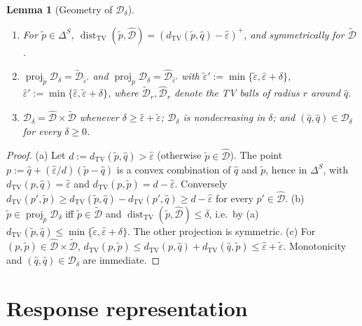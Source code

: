 \documentclass[11pt]{article}
\newtheorem{lemma}{Lemma}
\theoremstyle{definition}
\theoremstyle{remark}
\newcommand{\D}{\mathcal{D}}
\newcommand{\Dh}{\hat{\mathcal{D}}}
\newcommand{\Dt}{\tilde{\mathcal{D}}}
\newcommand{\tp}{\tilde{p}}
\newcommand{\heps}{\hat{\varepsilon}}
\newcommand{\teps}{\tilde{\varepsilon}}
\newcommand{\dtv}{d_{\mathrm{TV}}}
\DeclareMathOperator{\proj}{proj}
\DeclareMathOperator{\dist}{dist}
\begin{document}
\begin{lemma}[Geometry of $\D_\delta$]\label{lem:geom}
\begin{enumerate}[label=(\alph*),nosep]
\item For $\tp\in\Delta^S$, $\dist_{\mathrm{TV}}(\tp,\Dh)=(\dtv(\tp,\hat q)-\heps)^+$, and symmetrically for $\Dt$.
\item $\proj_{\tp}\D_\delta=\Dt_{\teps'}$ and $\proj_p\D_\delta=\Dh_{\heps'}$ with $\teps':=\min\{\teps,\heps+\delta\}$, $\heps':=\min\{\heps,\teps+\delta\}$, where $\Dt_r,\Dh_r$ denote the TV balls of radius $r$ around $\hat q$.
\item $\D_\delta=\Dh\times\Dt$ whenever $\delta\ge\heps+\teps$; $\D_\delta$ is nondecreasing in $\delta$; and $(\hat q,\hat q)\in\D_\delta$ for every $\delta\ge0$.
\end{enumerate}
\end{lemma}
\begin{proof}
(a) Let $d:=\dtv(\tp,\hat q)>\heps$ (otherwise $\tp\in\Dh$). The point $p:=\hat q+(\heps/d)(\tp-\hat q)$ is a convex combination of $\hat q$ and $\tp$, hence in $\Delta^S$, with $\dtv(p,\hat q)=\heps$ and $\dtv(p,\tp)=d-\heps$. Conversely $\dtv(p',\tp)\ge\dtv(\tp,\hat q)-\dtv(p',\hat q)\ge d-\heps$ for every $p'\in\Dh$.
(b) $\tp\in\proj_{\tp}\D_\delta$ iff $\tp\in\Dt$ and $\dist_{\mathrm{TV}}(\tp,\Dh)\le\delta$, i.e.\ by (a) $\dtv(\tp,\hat q)\le\min\{\teps,\heps+\delta\}$. The other projection is symmetric.
(c) For $(p,\tp)\in\Dh\times\Dt$, $\dtv(p,\tp)\le\dtv(p,\hat q)+\dtv(\hat q,\tp)\le\heps+\teps$. Monotonicity and $(\hat q,\hat q)\in\D_\delta$ are immediate.
\end{proof}

\section{Response representation}
\end{document}
